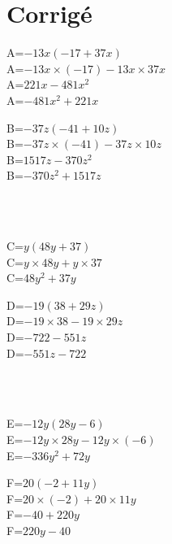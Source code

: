 \documentclass{article}%
\begin{document}
\section{Corrigé}%
\label{sec:Corrig}%
\begin{minipage}{0.5\textwidth}%
A=$-13x(-17+37x)$\\%
A=$-13x \times (-17)-13x \times 37x$\\%
A=$221x-481x^2$\\%
A=$-481x^2+221x$\\%
\end{minipage}%
\begin{minipage}{0.5\textwidth}%
B=$-37z(-41+10z)$\\%
B=$-37z \times (-41)-37z \times 10z$\\%
B=$1517z-370z^2$\\%
B=$-370z^2+1517z$\\%
\end{minipage}%
\\%
\\%
\begin{minipage}{0.5\textwidth}%
C=$y(48y+37)$\\%
C=$y \times 48y+y \times 37$\\%
C=$48y^2+37y$\\%
\end{minipage}%
\begin{minipage}{0.5\textwidth}%
D=$-19(38+29z)$\\%
D=$-19 \times 38-19 \times 29z$\\%
D=$-722-551z$\\%
D=$-551z-722$\\%
\end{minipage}%
\\%
\\%
\begin{minipage}{0.5\textwidth}%
E=$-12y(28y-6)$\\%
E=$-12y \times 28y-12y \times (-6)$\\%
E=$-336y^2+72y$\\%
\end{minipage}%
\begin{minipage}{0.5\textwidth}%
F=$20(-2+11y)$\\%
F=$20 \times (-2)+20 \times 11y$\\%
F=$-40+220y$\\%
F=$220y-40$\\%
\end{minipage}%
\\%
\\%
\end{document}
